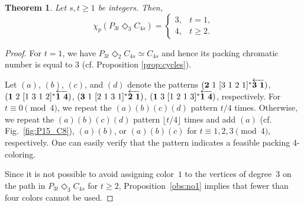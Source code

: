 \documentclass{article}
\newtheorem{theorem}{Theorem}
\begin{document}
\begin{theorem}
    Let $s,t \geq 1$ be integers. Then,
$$\chi_p(P_{3t}\Diamond_3 C_{4s}) = \left\{
\begin{array}{ll}
3, & t=1,\\
4, & t\geq 2.
\end{array}\right.
$$
\end{theorem}
\begin{proof}
For $t=1$, we have $P_{3t} \Diamond_2 C_{4s} \simeq C_{4s}$ and hence its packing chromatic number is equal to 3 (cf. Proposition \ref{prop:cycles}).     

\noindent Let $(a)$, $(b)$, $(c)$, and $(d)$ denote the patterns $({\bf 2}\ 1\ [3\ 1\ 2\ 1]^* \overleftarrow{{\bf 3\ 1}})$, $({\bf 1}\ 2\ [1\ 3\ 1\ 2]^* \overleftarrow{{\bf 1\ 4}})$, $({\bf 3}\ 1\ [2\ 1\ 3\ 1]^* \overleftarrow{{\bf 2\ 1}})$, $({\bf 1}\ 3\ [1\ 2\ 1\ 3]^* \overleftarrow{{\bf 1\ 4}})$, respectively.
For $t \equiv 0 \pmod{4}$, we repeat the $(a)(b)(c)(d)$ pattern $t/4$ times. Otherwise, we repeat the $(a)(b)(c)(d)$ pattern $\lfloor t/4\rfloor $ times and add $(a)$ (cf. Fig.~\ref{fig:P15_C8}), $(a)(b)$, or $(a)(b)(c)$ for $t \equiv 1, 2, 3 \pmod{4}$, respectively.
One can easily verify that the pattern indicates a feasible packing 4-coloring.

\noindent Since it is not possible to avoid assigning color~$1$ to the vertices of degree~$3$ on the path in $P_{3t} \Diamond_3 C_{4s}$ for $t \geq 2$, Proposition~\ref{obs:no1} implies that fewer than four colors cannot be used.
\end{proof}
\end{document}
